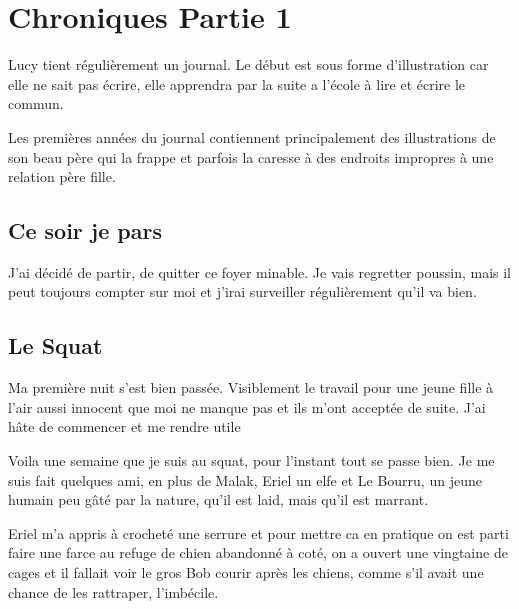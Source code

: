 \documentclass[10pt,a4paper,twoside,twocolumn,openany]{book}
\begin{document}
\vspace{2cm}

\chapter{Chroniques Partie 1}


\begin{quotebox}
Lucy tient régulièrement un journal. Le début est sous forme d'illustration car elle ne sait pas écrire, elle 
apprendra par la suite a l'école à lire et écrire le commun.

Les premières années du journal contiennent principalement des illustrations de son beau père qui la frappe et parfois la caresse à des 
endroits impropres à une relation père fille.
\end{quotebox}

\section{Ce soir je pars}

J'ai décidé de partir, de quitter ce foyer minable. Je vais regretter poussin, mais 
il peut toujours compter sur moi et j'irai surveiller régulièrement qu'il va bien.

\section{Le Squat}

Ma première nuit s'est bien passée. Visiblement le travail pour une jeune fille
à l'air aussi innocent que moi ne manque pas et ils m'ont acceptée de suite. J'ai
hâte de commencer et me rendre utile

Voila une semaine que je suis au squat, pour l'instant tout se passe bien. Je me 
suis fait quelques ami, en plus de Malak, Eriel un elfe et Le Bourru, un jeune 
humain peu gâté par la nature, qu'il est laid, mais qu'il est marrant.

Eriel m'a appris à crocheté une serrure et pour mettre ca en pratique on est parti
faire une farce au refuge de chien abandonné à coté, on a ouvert une vingtaine
de cages et il fallait voir le gros Bob courir après les chiens, comme s'il avait une chance de
les rattraper, l'imbécile.
\end{document}
